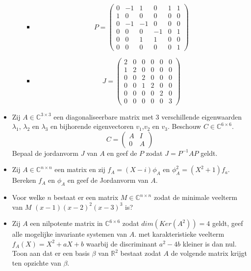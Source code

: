 \documentclass[main.tex]{subfiles}
\begin{document}
\begin{itemize}
\begin{itemize}
\begin{itemize}
     \item 
       \[ P = 
       \left(
         \begin{array}{ccccc|c}
           0 & -1 & 1 & 0 & 1 & 1\\
           1 & 0 & 0 & 0 & 0 & 0\\
           0 & -1 & -1 & 0 & 0 & 0\\
           0 & 0 & 0 & -1 & 0 & 1\\
           0 & 0 & 1 & 1 & 0 & 0 \\
           0 & 0 & 0 & 0 & 0 & 1
         \end{array}
       \right)
       \]
     \item 
       \[
       J = 
       \left(
         \begin{array}{ccccc|c}
           2 & 0 & 0 & 0 & 0 & 0\\
           1 & 2 & 0 & 0 & 0 & 0\\
           0 & 0 & 2 & 0 & 0 & 0\\
           0 & 0 & 1 & 2 & 0 & 0\\
           0 & 0 & 0 & 0 & 2 & 0\\\hline
           0 & 0 & 0 & 0 & 0 & 3
         \end{array}
       \right)
       \]
     \end{itemize}
   \end{itemize}
 \item Zij $A\in \mathbb{C}^{3\times 3}$ een diagonaliseerbare matrix met $3$ verschillende eigenwaarden $\lambda_{1}$, $\lambda_{2}$ en $\lambda_{3}$ en bijhorende eigenvectoren $v_{1}$,$v_{2}$ en $v_{3}$.
   Beschouw $C \in \mathbb{C}^{6\times 6}$.
   \[ C =
   \begin{pmatrix}
     A & I \\
     0 & A
   \end{pmatrix}
   \]
   Bepaal de jordanvorm $J$ van $A$ en geef de $P$ zodat $J=P^{-1}AP$ geldt.
 \item Zij $A\in \mathbb{C}^{n \times n}$ een matrix en zij $f_{A} = (X-i)\phi_{A}$ en $\phi_{A}^{2} = (X^{2}+1)f_{a}$.
   Bereken $f_{A}$ en $\phi_{A}$ en geef de Jordanvorm van $A$.
 \item Voor welke $n$ bestaat er een matrix $M\in \mathbb{C}^{n\times n}$ zodat de minimale veelterm van $M$ $(x-1)(x-2)^{2}(x-3)^{3}$ is?
 \item Zij $A$ een nilpotente matrix in $\mathbb{C}^{6\times 6}$ zodat $dim(Ker(A^{2}))=4$ geldt, geef alle mogelijke invariante systemen van $A$. met karakteristieke veelterm $f_{A}(X)=X^{2}+aX+b$ waarbij de discriminant $a^{2}-4b$ kleiner is dan nul.
   Toon aan dat er een basis $\beta$ van $\mathbb{R}^{2}$ bestaat zodat $A$ de volgende matrix krijgt ten opzichte van $\beta$.
 \end{itemize}
\end{document}
